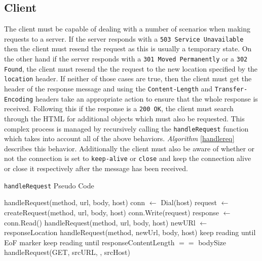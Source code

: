\documentclass[10pt,twocolumn]{witseiepaper}
\begin{document}
	\subsection{Client}

	The client must be capable of dealing with a number of scenarios when making requests to a server. If the server responds with a \texttt{503 Service Unavailable} then the client must resend the request as this is usually a temporary state. On the other hand if the server responds with a \texttt{301 Moved Permanently} or a \texttt{302 Found}, the client must resend the the request to the new location specified by the \texttt{location} header. If neither of those cases are true, then the client must get the header of the response message and using the \texttt{Content-Length} and \texttt{Transfer-Encoding} headers take an appropriate action to ensure that the whole response is received. Following this if the response is a \texttt{200 OK}, the client must search through the HTML for additional objects which must also be requested. This complex process is managed by recursively calling the \texttt{handleRequest} function which takes into account all of the above behaviors. \emph{Algorithm} \ref{handlereq} describes this behavior. Additionally the client must also be aware of whether or not the connection is set to \texttt{keep-alive} or \texttt{close} and keep the connection alive or close it respectively after the message has been received.

	\begin{algorithm}
	\caption{\texttt{handleRequest} Pseudo Code}
	\label{handlereq}
		\begin{algorithmic}
			\State handleRequest(method, url, body, host)
			\State conn $\gets$ Dial(host)
			\State request $\gets$ createRequest(method, url, body, host)
			\State conn.Write(request)
			\State response $\gets$ conn.Read()
				\State handleRequest(method, url, body, host)
				\State \Return
			\EndIf
				\State newURl $\gets$ responseLocation
				\State handleRequest(method, newUrl, body, host)
				\State \Return
			\EndIf
				\State keep reading until EoF marker
				\State keep reading until responseContentLength $==$ bodySize
			\EndIf
				\State handleRequest(GET, srcURL, , srcHost)
			\EndFor
		\end{algorithmic}
	\end{algorithm}
\end{document}
